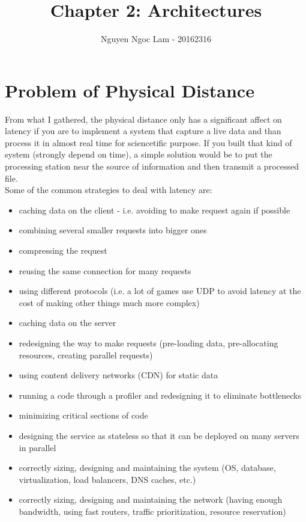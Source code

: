 \documentclass[11pt,a4paper]{article}
\title{Chapter 2: Architectures}
\date{\displaydate{date}}
\author{Nguyen Ngoc Lam - 20162316}
\begin{document}
  	\maketitle
  	\newpage
  	\tableofcontents
  	\newpage
  	
  	\section{Problem of Physical Distance}
  		From what I gathered, the physical distance only has a significant affect on latency if you are to implement a system that capture a live data and than process it in almost real time for sciencetific purpose. If you built that kind of system (strongly depend on time), a simple solution would be to put the processing station near the source of information and then transmit a processed file.\\
  		Some of the common strategies to deal with latency are:
  		\begin{itemize}
  			\item caching data on the client - i.e. avoiding to make request again if possible
    		\item combining several smaller requests into bigger ones
    		\item compressing the request
    		\item reusing the same connection for many requests
    		\item using different protocols (i.e. a lot of games use UDP to avoid latency at the cost of making other things much more complex)
    		\item caching data on the server
    		\item redesigning the way to make requests (pre-loading data, pre-allocating resources, creating parallel requests)
    		\item using content delivery networks (CDN) for static data
    		\item running a code through a profiler and redesigning it to eliminate bottlenecks
    		\item minimizing critical sections of code
    		\item designing the service as stateless so that it can be deployed on many servers in parallel
    		\item correctly sizing, designing and maintaining the system (OS, database, virtualization, load balancers, DNS caches, etc.)
    		\item correctly sizing, designing and maintaining the network (having enough bandwidth, using fast routers, traffic prioritization, resource reservation)
  		\end{itemize}
\end{document}
